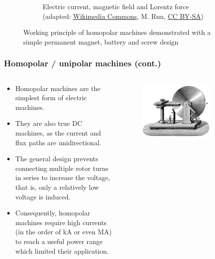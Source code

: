 \begin{frame}
\begin{figure}
\begin{subfigure}[b]{0.49\textwidth}
			\caption{Electric current, magnetic field and Lorentz force (adapted: \href{https://commons.wikimedia.org/wiki/File:Homopolar-motor.svg}{Wikimedia Commons}, M. Run, \href{https://creativecommons.org/licenses/by-sa/4.0/deed.en}{CC BY-SA})}
		\end{subfigure}
		\caption{Working principle of homopolar machines demonstrated with a simple permanent magnet, battery and screw design} 
        \label{fig:Homopolar_machine}
	\end{figure}
\end{frame}


\begin{frame}
	\frametitle{Homopolar / unipolar machines (cont.)}
    \begin{columns}
		\begin{column}{0.5\textwidth}
            \begin{itemize}
                \item  Homopolar machines are the simplest form of electric machines.
                \item They are also true DC machines, as the current and flux paths are unidirectional.
                \item<2-> The general design prevents connecting multiple rotor turns in series to increase the voltage, that is, only a relatively low voltage is induced.
                \item<3-> Consequently, homopolar machines require high currents (in the order of  \si{\kilo\ampere} or even \si{\mega\ampere}) to reach a useful power range which limited their application.
            \end{itemize}
		\end{column}
        \hfill
		\begin{column}{0.49\textwidth}
			\begin{figure}
				\centering
				\includegraphics[width=0.8\textwidth]{fig/lec03/Faraday_disk_generator.jpg}

\end{figure}
\end{column}
\end{columns}
\end{frame}
